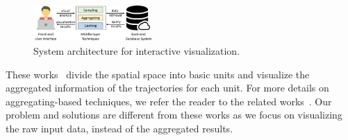 \begin{figure}
	\centering
	\includegraphics[width=0.40\textwidth]{pictures/framework/framework.pdf}
	\vspace{-2mm}
	\caption{System architecture for interactive visualization.} \label{fig:framework}
    \vspace{-2mm}
\end{figure}


These works~\cite{wood2010visualisation,guo2009flow,von2015mobilitygraphs} divide the {spatial space} into basic units and visualize the aggregated information of the trajectories for each unit. For more details on aggregating-based techniques, we refer the reader to the related works~\cite{andrienko2008spatio,adrienko2010spatial}. Our problem and solutions are different from these works as we focus on visualizing the raw input data, instead of the aggregated results.






